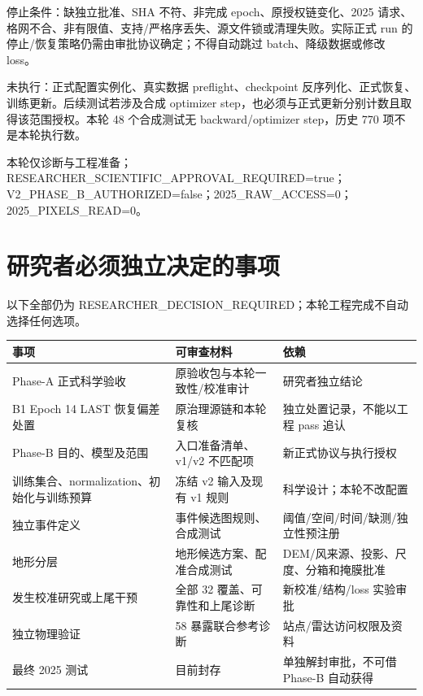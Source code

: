 \documentclass[UTF8,a4paper,10pt,fontset=fandol]{ctexart}
\begin{document}
停止条件：缺独立批准、SHA 不符、非完成 epoch、原授权链变化、2025 请求、格网不合、非有限值、支持/严格序丢失、源文件锁或清理失败。实际正式 run 的停止/恢复策略仍需由审批协议确定；不得自动跳过 batch、降级数据或修改 loss。\par

未执行：正式配置实例化、真实数据 preflight、checkpoint 反序列化、正式恢复、训练更新。后续测试若涉及合成 optimizer step，也必须与正式更新分别计数且取得该范围授权。本轮 48 个合成测试无 backward/optimizer step，历史 770 项不是本轮执行数。\par

本轮仅诊断与工程准备；RESEARCHER\_\allowbreak{}SCIENTIFIC\_\allowbreak{}APPROVAL\_\allowbreak{}REQUIRED=true；V2\_\allowbreak{}PHASE\_\allowbreak{}B\_\allowbreak{}AUTHORIZED=false；2025\_\allowbreak{}RAW\_\allowbreak{}ACCESS=0；2025\_\allowbreak{}PIXELS\_\allowbreak{}READ=0。\par

\clearpage
\section*{研究者必须独立决定的事项}

以下全部仍为 RESEARCHER\_\allowbreak{}DECISION\_\allowbreak{}REQUIRED；本轮工程完成不自动选择任何选项。\par

\begin{center}\scriptsize\begin{longtable}{@{}p{\dimexpr(\linewidth-4\tabcolsep)/3\relax}p{\dimexpr(\linewidth-4\tabcolsep)/3\relax}p{\dimexpr(\linewidth-4\tabcolsep)/3\relax}@{}}\toprule
事项 & 可审查材料 & 依赖\\
\midrule\endhead
Phase-A 正式科学验收 & 原验收包与本轮一致性/校准审计 & 研究者独立结论\\
B1 Epoch 14 LAST 恢复偏差处置 & 原治理源链和本轮复核 & 独立处置记录，不能以工程 pass 追认\\
Phase-B 目的、模型及范围 & 入口准备清单、v1/v2 不匹配项 & 新正式协议与执行授权\\
训练集合、normalization、初始化与训练预算 & 冻结 v2 输入及现有 v1 规则 & 科学设计；本轮不改配置\\
独立事件定义 & 事件候选图规则、合成测试 & 阈值/空间/时间/缺测/独立性预注册\\
地形分层 & 地形候选方案、配准合成测试 & DEM/风来源、投影、尺度、分箱和掩膜批准\\
发生校准研究或上尾干预 & 全部 32 覆盖、可靠性和上尾诊断 & 新校准/结构/loss 实验审批\\
独立物理验证 & 58 暴露联合参考诊断 & 站点/雷达访问权限及资料\\
最终 2025 测试 & 目前封存 & 单独解封审批，不可借 Phase-B 自动获得\\
\bottomrule\end{longtable}\end{center}\normalsize
\end{document}
